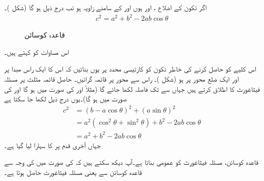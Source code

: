اگر تکون  کے اضلاع ،  اور  ہوں اور  کے سامنے  زاویہ  ہو تب درج ذیل ہو گا (شکل )۔
\begin{align}
c^2=a^2+b^2-2ab\cos \theta
\end{align}
%
\begin{figure}
\centering
{}
\caption{قاعدہ کوسائن}
\label{شکل_ابتدا_قاعدہ_کوسائن}
\end{figure}
اس مساوات کو  کہتے ہیں۔

اس کلیے کو حاصل کرنے کی خاطر تکون کو کارتیسی محدد پر یوں بنائیں کہ اس کا ایک راس مبدا پر اور ایک ضلع محور  پر ہو (شکل )۔ راس  سے محور  پر قائمہ گرائیں۔  حاصل قائمہ مثلث  پر مسئلہ فیثاغورث کا اطلاق کرتے ہیں جہاں   سے  تک فاصلہ  لکھا جائے گا (مثلاً  اور  کی صورت میں  ہو گا اور  کی صورت میں  ہو گا)۔یوں درج ذیل لکھا جا سکتا ہے
\begin{align*}
c^2&=(b-a\cos\theta)^2+(a\sin\theta)^2\\
&=a^2(\cos^2\theta+\sin^2\theta)+b^2-2ab\cos\theta\\
&=a^2+b^2-2ab\cos\theta
\end{align*}
جہاں آخری قدم پر  کا سہارا لیا گیا ہے۔

قاعدہ کوسائن، مسئلہ فیثاغورث کو عمومی بناتا ہے۔آپ دیکھ سکتے ہیں کہ  کی صورت میں  کی وجہ سے  قاعدہ کوسائن سے   یعنی مسئلہ فیثاغورث  حاصل ہوتا ہے۔

\\

